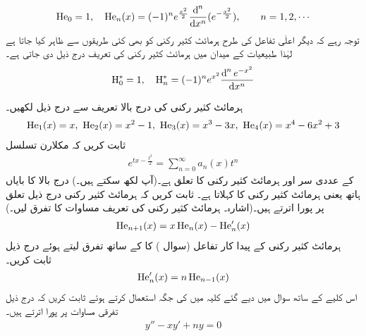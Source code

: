 \begin{align}\label{مساوات_طاقتی_ہرمائٹ_کثیر_رکنی_تعریف}
\He_0=1,\quad \He_n(x)=(-1)^n e^{\frac{x^2}{2}}\frac{\dif^{\,n}}{\dif x^n}(e^{-\frac{x^2}{2}}),\quad\quad n=1,2,\cdots 
\end{align}
توجہ رہے کہ دیگر اعلٰی تفاعل کی طرح ہرمائٹ کثیر رکنی کو بھی کئی طریقوں سے ظاہر کیا جاتا ہے لہٰذا طبیعیات کے میدان میں  ہرمائٹ کثیر رکنی  کی  تعریف درج ذیل دی جاتی ہے۔  
\begin{align*}
\mathrm{H}_0^*=1,\quad \mathrm{H}_n^*=(-1)^ne^{x^2}\frac{\dif ^{\, n} e^{-x^2}}{\dif x^n}
\end{align*}


ہرمائٹ کثیر رکنی کی درج بالا تعریف سے درج ذیل لکھیں۔
\begin{align*}
\operatorname{He}_1(x)=x,\,\, \operatorname{He}_2(x)=x^2-1,\,\, \operatorname{He}_3(x)=x^3-3x,\,\, \operatorname{He}_4(x)=x^4-6x^2+3
\end{align*}
ثابت کریں کہ  مکلارن تسلسل
\begin{align*}
e^{tx-\tfrac{t^2}{2}}=\sum_{n=0}^{\infty}a_n(x)t^n
\end{align*}
کے عددی سر اور ہرمائٹ کثیر رکنی کا تعلق  ہے۔(آپ  لکھ سکتے ہیں۔) درج بالا کا بایاں ہاتھ یعنی  ہرمائٹ کثیر رکنی کا  کہلاتا ہے۔
ثابت کریں کہ ہرمائٹ کثیر رکنی درج ذیل تعلق پر پورا اترتے ہیں۔(اشارہ۔ ہرمائٹ کثیر رکنی کی تعریف مساوات  کا تفرق لیں۔)
\begin{align*}
\operatorname{He}_{n+1}(x)=x\operatorname{He}_n(x)-\operatorname{He}_n'(x)
\end{align*}
ہرمائٹ کثیر رکنی کے پیدا کار تفاعل (سوال ) کا  کے ساتھ تفرق لیتے ہوئے درج ذیل ثابت کریں۔
\begin{align*}
\operatorname{He}_n'(x)=n\operatorname{He}_{n-1}(x)
\end{align*} 
اس کلیے کے ساتھ سوال  میں دیے گئے کلیہ میں  کی جگہ  استعمال کرتے ہوئے ثابت کریں کہ  درج ذیل تفرقی مساوات پر پورا اترتے ہیں۔
\begin{align*}
y''-xy'+ny=0
\end{align*} 
